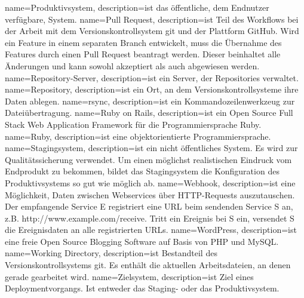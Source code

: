  {
  name=Produktivsystem,
  description={ist das öffentliche, dem Endnutzer verfügbare, System.}
}
 {
  name=Pull Request,
  description={ist Teil des Workflows bei der Arbeit mit dem Versionskontrollsystem git und der Plattform GitHub. Wird ein Feature in einem separaten Branch entwickelt, muss die Übernahme des Features durch einen Pull Request beantragt werden. Dieser beinhaltet alle Änderungen und kann sowohl akzeptiert als auch abgewiesen werden.}
}
 {
  name=Repository-Server,
  description={ist ein Server, der Repositories verwaltet.}
}
 {
  name=Repository,
  description={ist ein Ort, an dem Versionskontrollsysteme ihre Daten ablegen.}
}
 {
  name=rsync,
  description={ist ein Kommandozeilenwerkzeug zur Dateiübertragung.}
}
 {
  name=Ruby on Rails,
  description={ist ein Open Source Full Stack Web Application Framework für die Programmiersprache Ruby.}
}
 {
  name=Ruby,
  description={ist eine objektorientierte Programmiersprache.}
}
 {
  name=Stagingsystem,
  description={ist ein nicht öffentliches System. Es wird zur Qualitätssicherung verwendet. Um einen möglichst realistischen Eindruck vom Endprodukt zu bekommen, bildet das Stagingsystem die Konfiguration des Produktivsystems so gut wie möglich ab.}
}
 {
  name=Webhook,
  description={ist eine Möglichkeit, Daten zwischen Webservices über HTTP-Requests auszutauschen. Der empfangende Service E registriert eine URL beim sendenden Service S an, z.B. http://www.example.com/receive. Tritt ein Ereignis bei S ein, versendet S die Ereignisdaten an alle registrierten URLs.}
}
 {
  name=WordPress,
  description={ist eine freie Open Source Blogging Software auf Basis von PHP und MySQL.}
}
 {
  name=Working Directory,
  description={ist Bestandteil des Versionskontrollsystems git. Es enthält die aktuellen Arbeitsdateien, an denen gerade gearbeitet wird.}
}
 {
  name=Zielsystem,
  description={ist Ziel eines Deploymentvorgangs. Ist entweder das Staging- oder das Produktivsystem.}
}


\makeglossaries